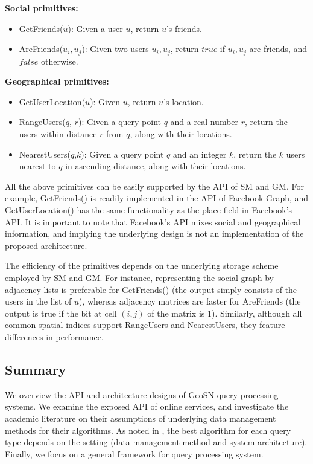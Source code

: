 \textbf{Social primitives:}
\begin{itemize}
	\item GetFriends($u$): Given a user $u$, return $u$’s friends.
	\item AreFriends($u_i,u_j$): Given two users $u_i, u_j$, return $true$ if $u_i, u_j$ are friends, and $false$ otherwise.
\end{itemize}

\textbf{Geographical primitives:} 
\begin{itemize}
	\item GetUserLocation($u$): Given $u$, return $u$’s location.
	\item RangeUsers($q$, $r$): Given a query point $q$ and a real number $r$, return the users within distance $r$ from $q$, along with their locations.
	\item NearestUsers($q$,$k$): Given a query point $q$ and an integer $k$, return the $k$ users nearest to $q$ in ascending distance, along with their locations.
\end{itemize}

All the above primitives can be easily supported by the API of SM and GM. For example, GetFriends() is readily implemented in the API of Facebook Graph, and GetUserLocation() has the same functionality as the place field in Facebook's API. It is important to note that Facebook's API mixes social and geographical information, and implying the underlying design is not an implementation of the proposed architecture.

The efficiency of the primitives depends on the underlying storage scheme employed by SM and GM. For instance, representing the social graph by adjacency lists is preferable for GetFriends() (the output simply consists of the users in the list of $u$), whereas adjacency matrices are faster for AreFriends (the output is true if the bit at cell $(i,j)$ of the matrix is 1). Similarly, although all common spatial indices support RangeUsers and NearestUsers, they feature differences in performance.

\subsection{Summary}
We overview the API and architecture designs of GeoSN query processing systems. We examine the exposed API of online services, and investigate the academic literature on their assumptions of underlying data management methods for their algorithms. As noted in \cite{armenatzoglou2013general}, the best algorithm for each query type depends on the setting (data management method and system architecture). Finally, we focus on a general framework for query processing system. 

